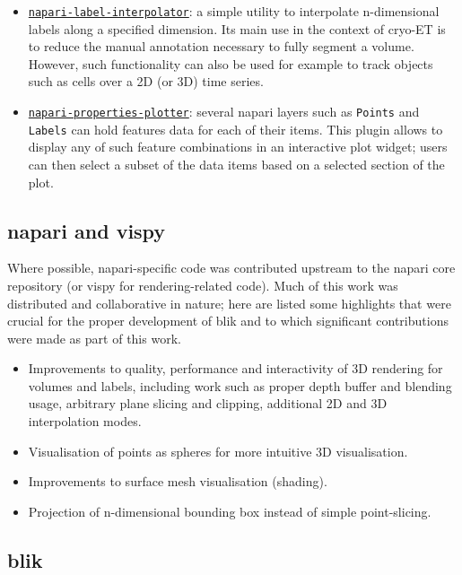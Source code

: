 \begin{itemize}[noitemsep] 
    \item \href{https://github.com/brisvag/napari-label-interpolator/}{\texttt{napari-label-interpolator}}: a simple utility to interpolate n-dimensional labels along a specified dimension. Its main use in the context of cryo-ET is to reduce the manual annotation necessary to fully segment a volume. However, such functionality can also be used for example to track objects such as cells over a 2D (or 3D) time series. 
    \item \href{https://github.com/brisvag/napari-properties-plotter/}{\texttt{napari-properties-plotter}}: several napari layers such as \texttt{Points} and \texttt{Labels} can hold features data for each of their items. This plugin allows to display any of such feature combinations in an interactive plot widget; users can then select a subset of the data items based on a selected section of the plot.
\end{itemize}

\subsection{napari and vispy}\label{napari-and-vispy}

Where possible, napari-specific code was contributed upstream to the napari core repository (or vispy for rendering-related code). Much of this work was distributed and collaborative in nature; here are listed some highlights that were crucial for the proper development of blik and to which significant contributions were made as part of this work.

\begin{itemize}[noitemsep] 
    \item Improvements to quality, performance and interactivity of 3D rendering for volumes and labels, including work such as proper depth buffer and blending usage, arbitrary plane slicing and clipping, additional 2D and 3D interpolation modes. 
    \item Visualisation of points as spheres for more intuitive 3D visualisation.
    \item Improvements to surface mesh visualisation (shading).
    \item Projection of n-dimensional bounding box instead of simple point-slicing.
\end{itemize}

\subsection{blik}

